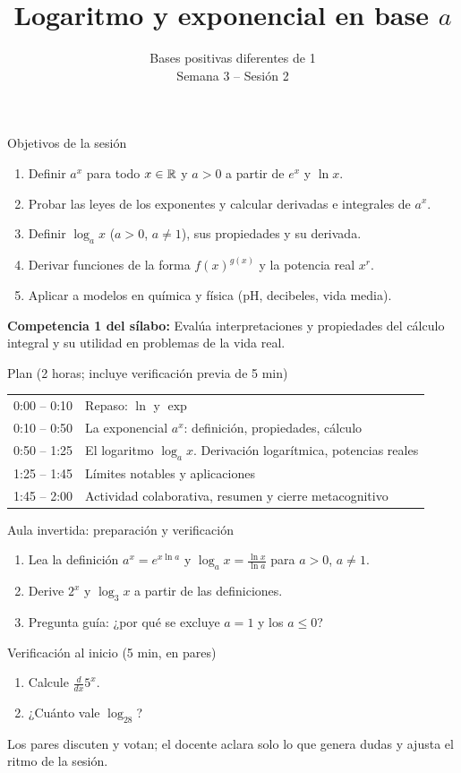 \documentclass[10pt,aspectratio=169]{beamer}
\title[Logaritmo y exponencial en base $a$]{Logaritmo y exponencial en base $a$}
\subtitle{Bases positivas diferentes de 1\\[2pt]\small Semana 3 -- Sesión 2}
\begin{document}
\begin{frame}
  \titlepage
\end{frame}

\begin{frame}{Objetivos de la sesión}
  \begin{enumerate}
    \item Definir $a^x$ para todo $x\in\mathbb{R}$ y $a>0$ a partir de $e^x$ y $\ln x$.
    \item Probar las leyes de los exponentes y calcular derivadas e integrales de $a^x$.
    \item Definir $\log_ax$ ($a>0$, $a\ne1$), sus propiedades y su derivada.
    \item Derivar funciones de la forma $f(x)^{g(x)}$ y la potencia real $x^r$.
    \item Aplicar a modelos en química y física (pH, decibeles, vida media).
  \end{enumerate}
  \vspace{1mm}
  {\small\textbf{Competencia 1 del sílabo:} Evalúa interpretaciones y propiedades del cálculo integral y su utilidad en problemas de la vida real.}
  \begin{block}{Plan (2 horas; incluye verificación previa de 5 min)}
    \begin{tabular}{ll}
      0:00 -- 0:10 & Repaso: $\ln$ y $\exp$\\
      0:10 -- 0:50 & La exponencial $a^x$: definición, propiedades, cálculo\\
      0:50 -- 1:25 & El logaritmo $\log_ax$. Derivación logarítmica, potencias reales\\
      1:25 -- 1:45 & Límites notables y aplicaciones\\
      1:45 -- 2:00 & Actividad colaborativa, resumen y cierre metacognitivo
    \end{tabular}
  \end{block}
\end{frame}

\begin{frame}{Aula invertida: preparación y verificación}
  \small
  \begin{previa}
    \begin{enumerate}
      \item Lea la definición $a^x=e^{x\ln a}$ y $\log_ax=\frac{\ln x}{\ln a}$ para $a>0$, $a\ne1$.
      \item Derive $2^x$ y $\log_3x$ a partir de las definiciones.
      \item Pregunta guía: ¿por qué se excluye $a=1$ y los $a\le0$?
    \end{enumerate}
  \end{previa}
  \begin{block}{Verificación al inicio (5 min, en pares)}
    \begin{enumerate}
      \item Calcule $\frac{d}{dx}5^x$.
      \item ¿Cuánto vale $\log_28$?
    \end{enumerate}
    Los pares discuten y votan; el docente aclara solo lo que genera dudas y ajusta el ritmo de la sesión.
  \end{block}
\end{frame}
\end{document}
